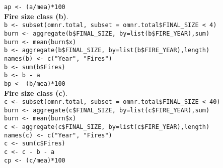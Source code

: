\begin{spacing}{1.5}
\noindent \texttt{ap <- (a/mea)*100} \\

\noindent \textbf{Fire size class (b)}. \\

\noindent \texttt{b <- subset(omnr.total, subset = omnr.total\$FINAL\_SIZE < 4)} \\

\noindent \texttt{burn <- aggregate(b\$FINAL\_SIZE, by=list(b\$FIRE\_YEAR),sum)} \\

\noindent \texttt{burn <- mean(burn\$x)} \\
                     
\noindent \texttt{b <- aggregate(b\$FINAL\_SIZE, by=list(b\$FIRE\_YEAR),length)} \\

\noindent \texttt{names(b) <- c("Year", "Fires")} \\

\noindent \texttt{b <- sum(b\$Fires)} \\

\noindent \texttt{b <- b - a} \\

\noindent \texttt{bp <- (b/mea)*100} \\

\noindent \textbf{Fire size class (c)}. \\

\noindent \texttt{c <- subset(omnr.total, subset = omnr.total\$FINAL\_SIZE < 40)} \\

\noindent \texttt{burn <- aggregate(c\$FINAL\_SIZE, by=list(c\$FIRE\_YEAR),sum)} \\

\noindent \texttt{burn <- mean(burn\$x)} \\
                     
\noindent \texttt{c <- aggregate(c\$FINAL\_SIZE, by=list(c\$FIRE\_YEAR),length)} \\

\noindent \texttt{names(c) <- c("Year", "Fires")} \\

\noindent \texttt{c <- sum(c\$Fires)} \\

\noindent \texttt{c <- c - b - a} \\

\noindent \texttt{cp <- (c/mea)*100} \\


\end{spacing}
